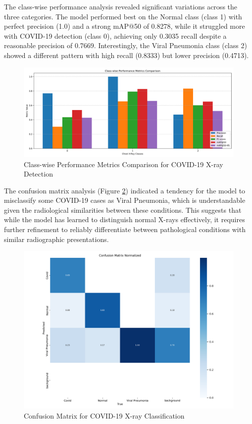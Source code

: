 \begin{multicols}{2}
The class-wise performance analysis revealed significant variations across the three categories. The model performed best on the Normal class (class 1) with perfect precision (1.0) and a strong mAP@50 of 0.8278, while it struggled more with COVID-19 detection (class 0), achieving only 0.3035 recall despite a reasonable precision of 0.7669. Interestingly, the Viral Pneumonia class (class 2) showed a different pattern with high recall (0.8333) but lower precision (0.4713).

\begin{figure}[h]
\centering
\includegraphics[width=0.9\columnwidth]{../datas/x_ray_summary_datas/x_ray_class_comparison.png}
\caption{Class-wise Performance Metrics Comparison for COVID-19 X-ray Detection}
\label{fig:covid_class_metrics}
\end{figure}

The confusion matrix analysis (Figure \ref{fig:covid_confusion}) indicated a tendency for the model to misclassify some COVID-19 cases as Viral Pneumonia, which is understandable given the radiological similarities between these conditions. This suggests that while the model has learned to distinguish normal X-rays effectively, it requires further refinement to reliably differentiate between pathological conditions with similar radiographic presentations.

\begin{figure}[h]
\centering
\includegraphics[width=0.9\columnwidth]{../datas/x_ray_summary_datas/x_ray_confusion_matrix_normalized.png}
\caption{Confusion Matrix for COVID-19 X-ray Classification}
\label{fig:covid_confusion}
\end{figure}


\end{multicols}
